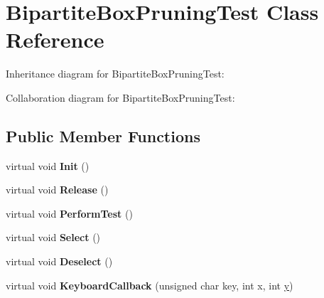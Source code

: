 \hypertarget{class_bipartite_box_pruning_test}{\section{Bipartite\+Box\+Pruning\+Test Class Reference}
\label{class_bipartite_box_pruning_test}
}


Inheritance diagram for Bipartite\+Box\+Pruning\+Test\+:


Collaboration diagram for Bipartite\+Box\+Pruning\+Test\+:
\subsection*{Public Member Functions}
\begin{DoxyCompactItemize}
\item 
\hypertarget{class_bipartite_box_pruning_test_a21fb7e8a3dd33a79773a417a287067c5}{virtual void {\bfseries Init} ()}\label{class_bipartite_box_pruning_test_a21fb7e8a3dd33a79773a417a287067c5}

\item 
\hypertarget{class_bipartite_box_pruning_test_a4a88fb733b2419848a86f9867171e02c}{virtual void {\bfseries Release} ()}\label{class_bipartite_box_pruning_test_a4a88fb733b2419848a86f9867171e02c}

\item 
\hypertarget{class_bipartite_box_pruning_test_afe7bdf78e91b407633025d65cd6474e1}{virtual void {\bfseries Perform\+Test} ()}\label{class_bipartite_box_pruning_test_afe7bdf78e91b407633025d65cd6474e1}

\item 
\hypertarget{class_bipartite_box_pruning_test_a690ccf0a5897d69069a6b263ead89b71}{virtual void {\bfseries Select} ()}\label{class_bipartite_box_pruning_test_a690ccf0a5897d69069a6b263ead89b71}

\item 
\hypertarget{class_bipartite_box_pruning_test_a29245c7f86e1f2cfbab8247b78e0488f}{virtual void {\bfseries Deselect} ()}\label{class_bipartite_box_pruning_test_a29245c7f86e1f2cfbab8247b78e0488f}

\item 
\hypertarget{class_bipartite_box_pruning_test_a803a2476628ce3688901ce06e970787e}{virtual void {\bfseries Keyboard\+Callback} (unsigned char key, int x, int \hyperlink{_ice_utils_8h_aa7ffaed69623192258fb8679569ff9ba}{y})}\label{class_bipartite_box_pruning_test_a803a2476628ce3688901ce06e970787e}


\end{DoxyCompactItemize}

